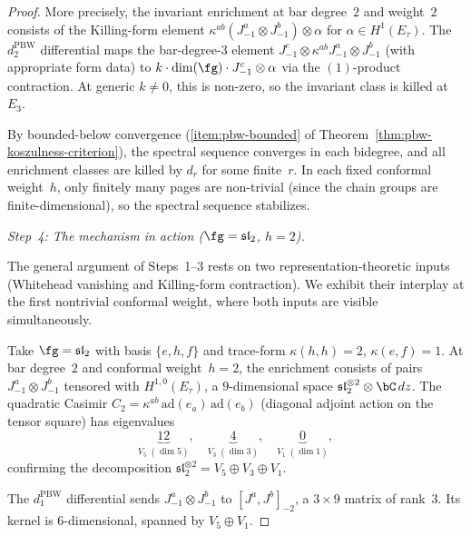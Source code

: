 \begin{proof}
More precisely, the invariant enrichment at bar
degree~$2$ and weight~$2$ consists of the Killing-form
element $\kappa^{ab} (J^a_{-1} \otimes J^b_{-1})
\otimes \alpha$ for
$\alpha \in H^1(E_\tau)$.  The $d_2^{\mathrm{PBW}}$
differential maps the bar-degree-$3$ element
$J^c_{-1} \otimes \kappa^{ab} J^a_{-1} \otimes J^b_{-1}$
(with appropriate form data) to
$k \cdot \dim(\fg) \cdot J^c_{-1} \otimes \alpha$ via the
$(1)$-product contraction.  At generic $k \neq 0$,
this is non-zero, so the invariant class is killed
at~$E_3$.

By bounded-below convergence
(\ref{item:pbw-bounded} of
Theorem~\ref{thm:pbw-koszulness-criterion}), the
spectral sequence converges in each bidegree, and
all enrichment classes are killed by $d_r$ for
some finite~$r$.  In each fixed conformal weight~$h$,
only finitely many pages are non-trivial (since the
chain groups are finite-dimensional), so the spectral
sequence stabilizes.

\medskip
\emph{Step~4: The mechanism in action ($\fg = \mathfrak{sl}_2$, $h = 2$).}

The general argument of Steps~1--3 rests on two
representation-theoretic inputs (Whitehead vanishing and
Killing-form contraction).  We exhibit their interplay
at the first nontrivial conformal weight, where both
inputs are visible simultaneously.

Take $\fg = \mathfrak{sl}_2$ with basis $\{e, h, f\}$ and
trace-form $\kappa(h,h) = 2$, $\kappa(e,f) = 1$.
At bar degree~$2$ and conformal weight~$h = 2$, the enrichment
consists of pairs $J^a_{-1} \otimes J^b_{-1}$ tensored with
$H^{1,0}(E_\tau)$, a $9$-dimensional space
$\mathfrak{sl}_2^{\otimes 2} \otimes \bC\,dz$.
The quadratic Casimir
$C_2 = \kappa^{ab}\,\mathrm{ad}(e_a)\,\mathrm{ad}(e_b)$
(diagonal adjoint action on the tensor square) has eigenvalues
\[
\underbrace{12}_{V_5\; (\dim 5)}, \quad
\underbrace{4}_{V_3\; (\dim 3)}, \quad
\underbrace{0}_{V_1\; (\dim 1)},
\]
confirming the decomposition
$\mathfrak{sl}_2^{\otimes 2} = V_5 \oplus V_3 \oplus V_1$.

The $d_1^{\mathrm{PBW}}$ differential sends
$J^a_{-1} \otimes J^b_{-1}$ to $[J^a, J^b]_{-2}$,
a $3 \times 9$ matrix of rank~$3$.  Its kernel is
$6$-dimensional, spanned by $V_5 \oplus V_1$.


\end{proof}
